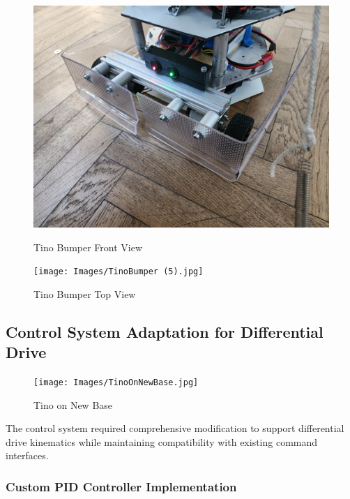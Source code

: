 \begin{figure}[H]
    \centering
    \begin{minipage}{0.45\textwidth}
        \centering
        \includegraphics[width=\textwidth]{Images/TinoBumper (4).jpg}
        \caption{Tino Bumper Front View}
        \label{fig:tino_bumper_front}
    \end{minipage}
    \hfill
    \begin{minipage}{0.45\textwidth}
        \centering
        \texttt{[image: Images/TinoBumper (5).jpg]}
        \caption{Tino Bumper Top View}
        \label{fig:tino_bumper_top}
    \end{minipage}
\end{figure}

\subsection{Control System Adaptation for Differential Drive}

\begin{figure}[H]
    \centering
    \texttt{[image: Images/TinoOnNewBase.jpg]}
    \caption{Tino on New Base}
    \label{fig:tino_on_new_base}
\end{figure}

The control system required comprehensive modification to support differential drive kinematics while maintaining compatibility with existing command interfaces.

\subsubsection{Custom PID Controller Implementation}

